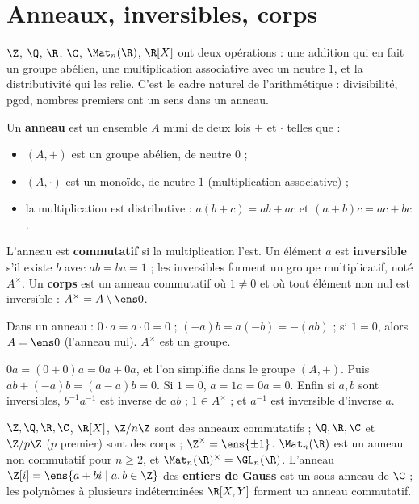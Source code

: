 \section{Anneaux, inversibles, corps}
\begin{intuition}
$\Z$, $\Q$, $\R$, $\C$, $\Mat_n(\R)$, $\R[X]$ ont deux opérations : une addition qui en fait un groupe abélien, une multiplication associative avec un neutre $1$, et la distributivité qui les relie. C'est le cadre naturel de l'arithmétique : divisibilité, pgcd, nombres premiers ont un sens dans un anneau.
\end{intuition}
\begin{definition}\label{def-anneau}
Un \textbf{anneau} est un ensemble $A$ muni de deux lois $+$ et $\cdot$ telles que :
\begin{itemize}
\item $(A,+)$ est un groupe abélien, de neutre $0$ ;
\item $(A,\cdot)$ est un monoïde, de neutre $1$ (multiplication associative) ;
\item la multiplication est distributive : $a(b+c)=ab+ac$ et $(a+b)c=ac+bc$.
\end{itemize}
L'anneau est \textbf{commutatif} si la multiplication l'est. Un élément $a$ est \textbf{inversible} s'il existe $b$ avec $ab=ba=1$ ; les inversibles forment un groupe multiplicatif, noté $A^\times$. Un \textbf{corps} est un anneau commutatif où $1\neq0$ et où tout élément non nul est inversible : $A^\times=A\setminus\ens0$.
\end{definition}
\begin{proposition}
Dans un anneau : $0\cdot a=a\cdot0=0$ ; $(-a)b=a(-b)=-(ab)$ ; si $1=0$, alors $A=\ens0$ (l'anneau nul). $A^\times$ est un groupe.
\end{proposition}
\begin{preuve}
$0a=(0+0)a=0a+0a$, et l'on simplifie dans le groupe $(A,+)$. Puis $ab+(-a)b=(a-a)b=0$. Si $1=0$, $a=1a=0a=0$. Enfin si $a,b$ sont inversibles, $b^{-1}a^{-1}$ est inverse de $ab$ ; $1\in A^\times$ ; et $a^{-1}$ est inversible d'inverse $a$.
\end{preuve}
\begin{exemple}
$\Z,\Q,\R,\C$, $\R[X]$, $\Z/n\Z$ sont des anneaux commutatifs ; $\Q,\R,\C$ et $\Z/p\Z$ ($p$ premier) sont des corps ; $\Z^\times=\ens{\pm1}$. $\Mat_n(\R)$ est un anneau non commutatif pour $n\ge2$, et $\Mat_n(\R)^\times=\GL_n(\R)$. L'anneau $\Z[i]=\ens{a+bi\mid a,b\in\Z}$ des \textbf{entiers de Gauss} est un sous-anneau de $\C$ ; les polynômes à plusieurs indéterminées $\R[X,Y]$ forment un anneau commutatif.
\end{exemple}
